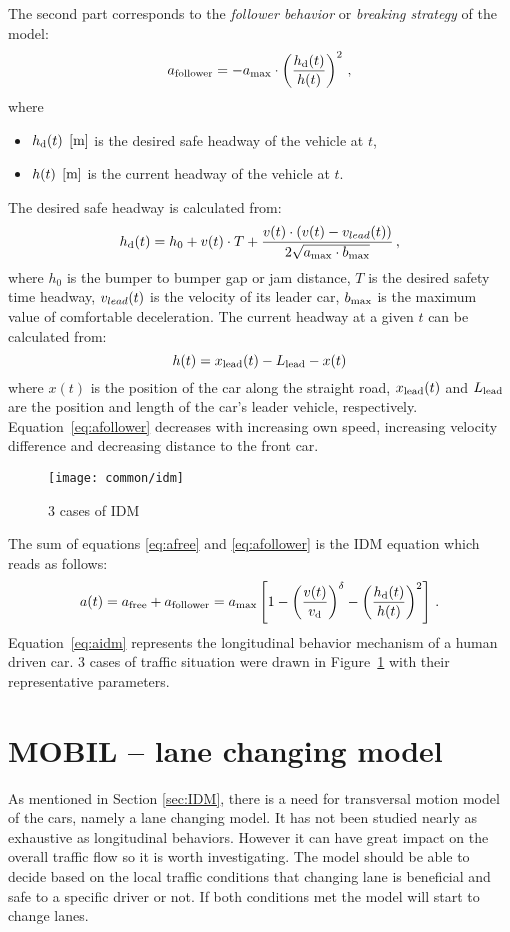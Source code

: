 		The second part corresponds to the \textit{follower behavior} or \textit{breaking strategy} of the model:
		\begin{equation}
			a_{\rm follower}=-a_{\rm max}\cdot \left ( \frac{h_{\rm d}(t)}{h(t)} \right )^2\,,
			\label{eq:afollower}
		\end{equation}
		where
		\begin{itemize}
			\item $h_{\rm d}(t)$ $\rm [m]$ is the desired safe headway of the vehicle at $t$,
			\item $h(t)$ $\rm [m]$ is the current headway of the vehicle at $t$.
		\end{itemize}
		The desired safe headway is calculated from:
		\begin{equation}
			h_{\rm d}(t)=h_0 + v(t)\cdot T + \frac{v(t)\cdot(v(t)-v_{lead}(t))}{2\sqrt{a_{\rm max}\cdot b_{\rm max}}}\,,
		\end{equation}
		where $h_0$ is the bumper to bumper gap or jam distance, $T$ is the desired safety time headway, $v_{lead}(t)$ is the velocity of its leader car, $b_{\rm max}$ is the maximum value of comfortable deceleration.
		The current headway at a given $t$ can be calculated from:
		\begin{equation}
		h(t)=x_{\rm lead}(t)-L_{\rm lead}- x(t)
		\end{equation}
		where $x(t)$ is the position of the car along the straight road, $x_{\rm lead}(t)$ and $L_{\rm lead}$ are the position and length of the car's leader vehicle, respectively.
		Equation~\eqref{eq:afollower} decreases with increasing own speed, increasing velocity difference and decreasing distance to the front car.
		\begin{figure}
			\centering
			\texttt{[image: common/idm]}
			\caption{3 cases of IDM}
			\label{fig:idm}
		\end{figure}
		The sum of equations \eqref{eq:afree} and \eqref{eq:afollower} is the IDM equation which reads as follows:
		\begin{equation}
			a(t)=a_{\rm free}+a_{\rm follower}=a_{\rm max}\left [ 1 - \left ( \frac{v(t)}{{v_{\rm d}}} \right )^{\delta} - \left ( \frac{h_{\rm d}(t)}{h(t)} \right )^2 \right ]\,.
			\label{eq:aidm}
		\end{equation}
		Equation~\eqref{eq:aidm} represents the longitudinal behavior mechanism of a human driven car. 3 cases of traffic situation were drawn in Figure~\ref{fig:idm} with their representative parameters.
	\section{MOBIL -- lane changing model} \label{sec:MOBIL}
		As mentioned in Section \ref{sec:IDM}, there is a need for transversal motion model of the cars, namely a lane changing model. It has not been studied nearly as exhaustive as longitudinal behaviors. However it can have great impact on the overall traffic flow so it is worth investigating. The model should be able to decide based on the local traffic conditions that changing lane is beneficial and safe to a specific driver or not. If both conditions met the model will start to change lanes.

